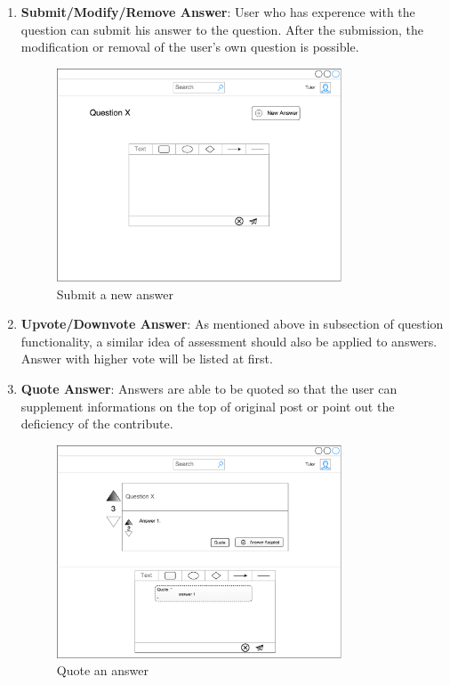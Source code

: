 \begin{enumerate}
\item
\textbf{Submit/Modify/Remove Answer}: User who has experence with the question can submit his answer to the question. After the submission, the modification or removal of the user's own question is possible.

\begin{figure}[!htbp]
  \centering
    \includegraphics[width=0.8\textwidth]{Figures/mockup/New-Answer-modify.pdf}
  \caption{Submit a new answer}
\end{figure}

\item
\textbf{Upvote/Downvote Answer}: As mentioned above in subsection of question functionality, a similar idea of assessment should also be applied to answers. Answer with higher vote will be listed at first.


\item
\textbf{Quote Answer}: Answers are able to be quoted so that the user can supplement informations on the top of original post or point out the deficiency of the contribute.

\begin{figure}[!htbp]
  \centering
    \includegraphics[width=0.8\textwidth]{Figures/mockup/quote.pdf}
  \caption{Quote an answer}
\end{figure}


\end{enumerate}

